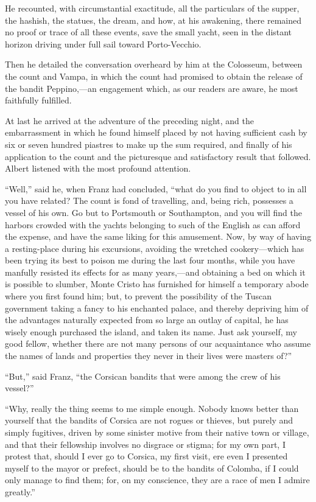 He recounted, with circumstantial exactitude, all the particulars of
the supper, the hashish, the statues, the dream, and how, at his
awakening, there remained no proof or trace of all these events, save
the small yacht, seen in the distant horizon driving under full sail
toward Porto-Vecchio.

Then he detailed the conversation overheard by him at the Colosseum,
between the count and Vampa, in which the count had promised to obtain
the release of the bandit Peppino,—an engagement which, as our readers
are aware, he most faithfully fulfilled.

At last he arrived at the adventure of the preceding night, and the
embarrassment in which he found himself placed by not having sufficient
cash by six or seven hundred piastres to make up the sum required, and
finally of his application to the count and the picturesque and
satisfactory result that followed. Albert listened with the most
profound attention.

“Well,” said he, when Franz had concluded, “what do you find to object
to in all you have related? The count is fond of travelling, and, being
rich, possesses a vessel of his own. Go but to Portsmouth or
Southampton, and you will find the harbors crowded with the yachts
belonging to such of the English as can afford the expense, and have
the same liking for this amusement. Now, by way of having a
resting-place during his excursions, avoiding the wretched
cookery—which has been trying its best to poison me during the last
four months, while you have manfully resisted its effects for as many
years,—and obtaining a bed on which it is possible to slumber, Monte
Cristo has furnished for himself a temporary abode where you first
found him; but, to prevent the possibility of the Tuscan government
taking a fancy to his enchanted palace, and thereby depriving him of
the advantages naturally expected from so large an outlay of capital,
he has wisely enough purchased the island, and taken its name. Just ask
yourself, my good fellow, whether there are not many persons of our
acquaintance who assume the names of lands and properties they never in
their lives were masters of?”

“But,” said Franz, “the Corsican bandits that were among the crew of
his vessel?”

“Why, really the thing seems to me simple enough. Nobody knows better
than yourself that the bandits of Corsica are not rogues or thieves,
but purely and simply fugitives, driven by some sinister motive from
their native town or village, and that their fellowship involves no
disgrace or stigma; for my own part, I protest that, should I ever go
to Corsica, my first visit, ere even I presented myself to the mayor or
prefect, should be to the bandits of Colomba, if I could only manage to
find them; for, on my conscience, they are a race of men I admire
greatly.”

